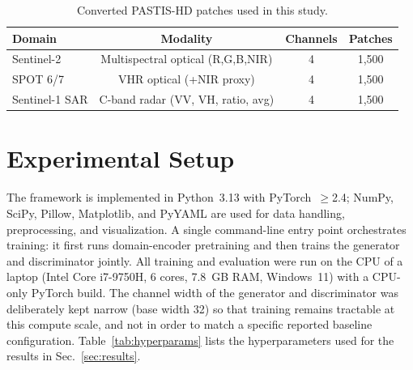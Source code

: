 \documentclass[runningheads]{llncs}
\begin{document}
\begin{table}[t]
\centering
\caption{Converted PASTIS-HD patches used in this study.}
\label{tab:dataset}
\begin{tabular}{@{}lccc@{}}
\toprule
\textbf{Domain} & \textbf{Modality} & \textbf{Channels} & \textbf{Patches} \\
\midrule
Sentinel-2       & Multispectral optical (R,G,B,NIR) & 4 & 1{,}500 \\
SPOT 6/7         & VHR optical (+NIR proxy)          & 4 & 1{,}500 \\
Sentinel-1 SAR   & C-band radar (VV, VH, ratio, avg) & 4 & 1{,}500 \\
\bottomrule
\end{tabular}
\end{table}

\section{Experimental Setup}
\label{sec:setup}
The framework is implemented in Python~3.13 with PyTorch~$\geq$2.4; NumPy, SciPy, Pillow, Matplotlib, and PyYAML are used for data handling, preprocessing, and visualization. A single command-line entry point orchestrates training: it first runs domain-encoder pretraining and then trains the generator and discriminator jointly. All training and evaluation were run on the CPU of a laptop (Intel Core i7-9750H, 6 cores, 7.8~GB RAM, Windows~11) with a CPU-only PyTorch build. The channel width of the generator and discriminator was deliberately kept narrow (base width 32) so that training remains tractable at this compute scale, and not in order to match a specific reported baseline configuration. Table~\ref{tab:hyperparams} lists the hyperparameters used for the results in Sec.~\ref{sec:results}.
\end{document}

